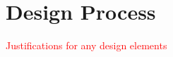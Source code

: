 \section{Design Process}
\label{sec:design} 

\textcolor{red}{Justifications for any design elements}